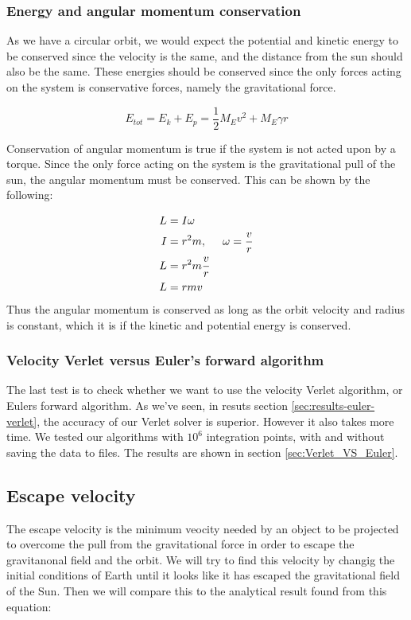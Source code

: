 \documentclass[../main.tex]{subfiles}
\begin{document}
\subsubsection{Energy and angular momentum conservation}
As we have a circular orbit, we would expect the potential and kinetic energy to be conserved since the velocity is the same, and the distance from the sun should also be the same. These energies should be conserved since the only forces acting on the system is conservative forces, namely the gravitational force.

$$E_{tot} = E_k + E_p = \frac{1}{2} M_E v^2 + M_E \gamma r$$

Conservation of angular momentum is true if the system is not acted upon by a torque. Since the only force acting on the system is the gravitational pull of the sun, the angular momentum must be conserved. This can be shown by the following:

\begin{align*}
  L &= I \omega \\
  I &= r^2m, \hspace{5mm} \omega = \frac{v}{r} \\
  L &= r^2m \frac{v}{r} \\
  L &= rmv
\end{align*}
Thus the angular momentum is conserved as long as the orbit velocity and radius is constant, which it is if the kinetic and potential energy is conserved.

\subsubsection{Velocity Verlet versus Euler's forward algorithm}
The last test is to check whether we want to use the velocity Verlet algorithm, or Eulers forward algorithm. As we've seen, in resuts section \ref{sec:results-euler-verlet}, the accuracy of our Verlet solver is superior. However it also takes more time. We tested our algorithms with $10^6$ integration points, with and without saving the data to files. The results are shown in section \ref{sec:Verlet_VS_Euler}.

\subsection{Escape velocity}\label{sec:theory-EscapeVelocity}
The escape velocity is the minimum veocity needed by an object to be projected to overcome the pull from the gravitational force in order to escape the gravitanonal field and the orbit. We will try to find this velocity by changig the initial conditions of Earth until it looks like it has escaped the gravitational field of the Sun. Then we will compare this to the analytical result found from this equation:
\end{document}
